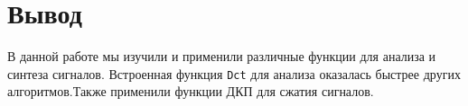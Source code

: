\documentclass[a4paper, 12pt]{report}
\begin{document}
	\chapter{Вывод}
	В данной работе мы изучили и применили различные функции для анализа и синтеза сигналов. Встроенная функция \texttt{Dct} для анализа оказалась быстрее других алгоритмов.Также применили функции ДКП для сжатия сигналов.
\end{document}
